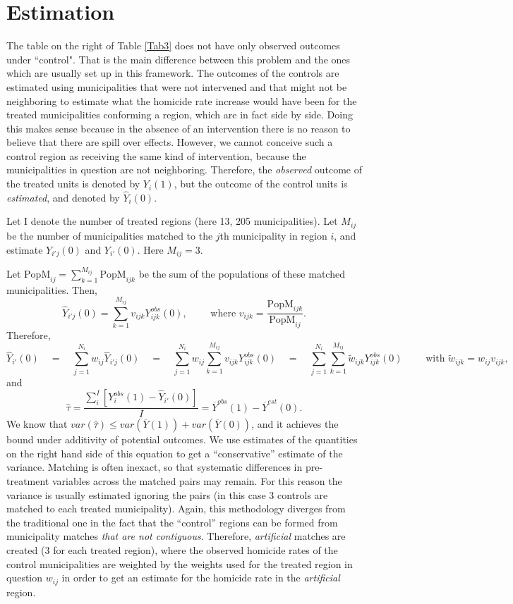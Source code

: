 \documentclass{article}[11 pt]
\begin{document}
\section{Estimation}

The table on the right of Table \ref{Tab3} does not have only observed outcomes under ``control". That is the main difference between this problem and the ones which are usually set up in this framework. The outcomes of the controls are estimated using municipalities that were not intervened and that might not be neighboring to estimate what the homicide rate increase would have been for the treated municipalities conforming a region, which are in fact side by side. Doing this makes sense because in the absence of an intervention there is no reason to believe that there are spill over effects. However, we cannot conceive such a control region as receiving the same kind of intervention, because the municipalities in question are not neighboring. Therefore, the \emph{observed} outcome of the treated units is denoted by $Y_i(1)$, but the outcome of the control units is \emph{estimated}, and denoted by $\hat{Y}_i(0)$. 	

Let I denote the number of treated regions (here 13, 205 municipalities). Let $M_{ij}$ be the number of municipalities matched to the $j$th municipality in region $i$, and estimate $Y_{i'j}(0)$ and $Y_{i'}(0)$. Here $M_{ij}=3$.

      Let $\textrm{PopM}_{ij}=\sum_{k=1}^{M_{ij}}\textrm{PopM}_{ijk}$ be the sum of the populations of these matched municipalities. %
 Then,
      $$\hat{Y}_{i'j}(0) =\sum_{k=1}^{M_{ij}}v_{ijk}Y^{obs}_{ijk}(0),\quad \quad \textrm{ where } v_{ijk}=\frac{\textrm{PopM}_{ijk}}{\textrm{PopM}_{ij}}.$$
      Therefore,
      $$\hat{Y}_{i'}(0) \quad =\quad \sum_{j=1}^{N_i}w_{ij}\hat{Y}_{i'j}(0)\quad =\quad\sum_{j=1}^{N_i}w_{ij}\sum_{k=1}^{M_{ij}}v_{ijk}Y^{obs}_{ijk}(0)\quad =\quad
      \sum_{j=1}^{N_i}\sum_{k=1}^{M_{ij}}\tilde{w}_{ijk}Y^{obs}_{ijk}(0) \quad \quad \textrm{ with } \tilde{w}_{ijk} = w_{ij}v_{ijk}, $$
      and
      $$\hat{\tau}=\frac{\sum_i^{I}[Y^{obs}_i(1) - \hat{Y}_{i'}(0)]}{I}=\overline{Y}^{obs}(1)-\overline{Y}^{est}(0).$$
      We know that $var(\hat{\tau})\leq var(\overline{Y}(1))+var(\overline{Y}(0))$, %
and it achieves the bound under additivity of potential outcomes. We use estimates of the quantities on the right hand side of this equation to get a ``conservative'' estimate of the variance. Matching is often inexact, so that systematic differences in pre-treatment variables across the matched pairs may remain. For this reason the variance is usually estimated ignoring the pairs (in this case 3 controls are matched to each treated municipality). Again, this methodology diverges from the traditional one in the fact that the ``control'' regions can be formed from municipality matches \emph{that are not contiguous}. Therefore, \emph{artificial} matches are created (3 for each treated region), where the observed homicide rates of the control municipalities are weighted by the weights used for the treated region in question $w_{ij}$ in order to get an estimate for the homicide rate in the \emph{artificial} region. 
\end{document}
